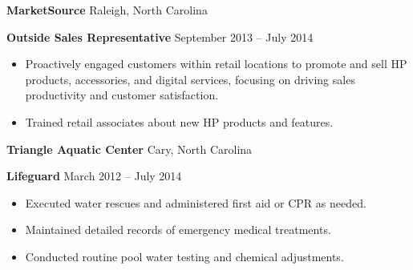 \documentclass[11pt]{article}
\begin{document}
\vspace{12pt}

\textbf{MarketSource} \hfill Raleigh, North Carolina

\textbf{Outside Sales Representative} \hfill September 2013 – July 2014
\begin{itemize}[noitemsep, topsep=0pt, partopsep=0pt, parsep=0pt]
    \item Proactively engaged customers within retail locations to promote and sell HP products, accessories, and digital services, focusing on driving sales productivity and customer satisfaction.
    \item Trained retail associates about new HP products and features.
\end{itemize}


\textbf{Triangle Aquatic Center} \hfill Cary, North Carolina

\textbf{Lifeguard} \hfill March 2012 – July 2014
\begin{itemize}[noitemsep, topsep=0pt, partopsep=0pt, parsep=0pt]
    \item Executed water rescues and administered first aid or CPR as needed.
    \item Maintained detailed records of emergency medical treatments.
    \item Conducted routine pool water testing and chemical adjustments.
\end{itemize}

\end{document}
